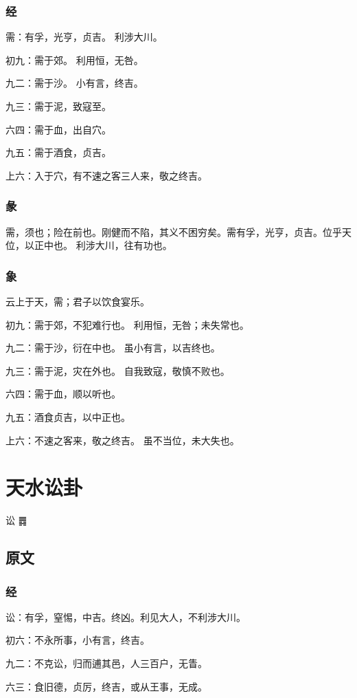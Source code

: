 \documentclass[12pt,oneside]{book}
\begin{document}
\subsection{经}
需：有孚，光亨，贞吉。 利涉大川。

初九：需于郊。 利用恒，无咎。

九二：需于沙。 小有言，终吉。

九三：需于泥，致寇至。

六四：需于血，出自穴。

九五：需于酒食，贞吉。

上六：入于穴，有不速之客三人来，敬之终吉。

\subsection{彖}
需，须也；险在前也。刚健而不陷，其义不困穷矣。需有孚，光亨，贞吉。位乎天位，以正中也。 利涉大川，往有功也。

\subsection{象}
云上于天，需；君子以饮食宴乐。

初九：需于郊，不犯难行也。 利用恒，无咎；未失常也。

九二：需于沙，衍在中也。 虽小有言，以吉终也。

九三：需于泥，灾在外也。 自我致寇，敬慎不败也。

六四：需于血，顺以听也。

九五：酒食贞吉，以中正也。

上六：不速之客来，敬之终吉。 虽不当位，未大失也。


\chapter{天水讼卦}
讼 {\Large ䷅}

\section{原文}
\subsection{经}
讼：有孚，窒惕，中吉。终凶。利见大人，不利涉大川。

初六：不永所事，小有言，终吉。

九二：不克讼，归而逋其邑，人三百户，无眚。

六三：食旧德，贞厉，终吉，或从王事，无成。
\end{document}
